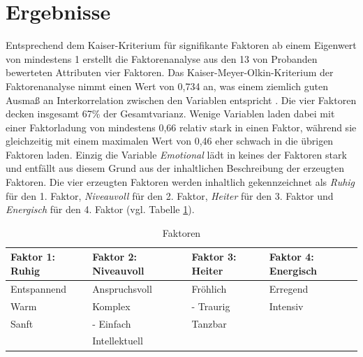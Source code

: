 \section*{Ergebnisse}
\label{sec:Ergebnisse}

Entsprechend dem Kaiser-Kriterium für signifikante Faktoren ab einem Eigenwert von mindestens 1 erstellt die Faktorenanalyse aus den 13 von Probanden bewerteten Attributen vier Faktoren.
Das Kaiser-Meyer-Olkin-Kriterium der Faktorenanalyse nimmt einen Wert von 0,734 an, was einem ziemlich guten Ausmaß an Interkorrelation zwischen den Variablen entspricht \cite{eckey2002multivariate}.
Die vier Faktoren decken insgesamt 67\% der Gesamtvarianz.
Wenige Variablen laden dabei mit einer Faktorladung von mindestens 0,66 relativ stark in einen Faktor, während sie gleichzeitig mit einem maximalen Wert von 0,46 eher schwach in die übrigen Faktoren laden.
Einzig die Variable \textit{Emotional} lädt in keines der Faktoren stark und entfällt aus diesem Grund aus der inhaltlichen Beschreibung der erzeugten Faktoren.
Die vier erzeugten Faktoren werden inhaltlich gekennzeichnet als \textit{Ruhig} für den 1. Faktor, \textit{Niveauvoll} für den 2. Faktor, \textit{Heiter} für den 3. Faktor und \textit{Energisch} für den 4. Faktor (vgl. Tabelle \ref{tab:faktoren}).   


\begin{table}[htbp]
    \centering
    \caption{Faktoren}
    \vspace{2mm}
    \label{tab:faktoren}
        \begin{tabularx}{8.4cm}{|X|X|X|X|}
            \hline Faktor 1: \textbf{Ruhig} & Faktor 2: \textbf{Niveauvoll} & Faktor 3: \textbf{Heiter} & Faktor 4: \textbf{Energisch} \\
            \hline Entspan\-nend & Anspruchs\-voll       & Fröhlich             & Erregend \\
            \hline Warm              & Komplex                  & - Traurig            & Intensiv \\
            \hline Sanft               & - Einfach                 & Tanzbar             & \\
            \hline                        & Intellek\-tuell          &                          & \\
            \hline
        \end{tabularx}
\end{table}


